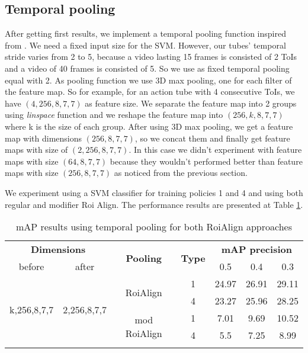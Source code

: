 \subsection{Temporal pooling}
After getting first results, we implement a temporal pooling function inspired from \cite{DBLP:journals/corr/HouCS17}. We need a
fixed input size for the SVM. However, our tubes' temporal stride varies from 2 to 5, because a video lasting 15 frames
is consisted of 2 ToIs and a video of 40 frames is consisted of 5. So we use as fixed temporal pooling equal
with 2. As pooling function we use 3D max pooling, one for each filter of the feature map.  So for example, for an action tube
with 4 consecutive ToIs, we  have $(4,256,8,7,7)$ as feature size. We separate the feature map into 2 groups using \textit{linspace}
function and we reshape the feature map into $(256,k,8,7,7)$ where k is the size of each group. After using 3D max pooling, we get
a feature map with dimensions $(256,8,7,7)$, so we concat them and finally get feature maps with size of $(2,256,8,7,7)$.
In this case we didn't experiment with feature maps with size $(64,8,7,7)$ because they wouldn't performed better than  feature maps with size $(256,8,7,7)$ as noticed from the previous section. \par
We experiment using a SVM classifier for training policies 1 and 4 and using both regular and modifier Roi Align. The
performance results are presented at Table \ref{table:svm_temp_pooling}.
\begin{center}
\begin{longtable}{||c | c| c| c||c c c||}

  \hline
 \multicolumn{2}{||c|}{\textbf{Dimensions}} & \multirow{2}{*}{\textbf{Pooling}} &\multirow{2}{*}{ \textbf{Type}} &\multicolumn{3}{|c||}{\textbf{mAP precision}}\\

  before & after & {} & {} & 0.5 &  0.4 & 0.3\\
  \hline   \hline

  \multirow{4}{*}{k,256,8,7,7} & \multirow{4}{*}{2,256,8,7,7} & \multirow{2}{*}{RoiAlign}  & 1 & 24.97 & 26.91 & 29.11 \\
  \cline{4-7}
  {} & {} & {} & 4 &  23.27 & 25.96 & 28.25 \\
  \cline{3-7}
  {} & {} & \multirow{2}{*}{mod RoiAlign} & 1 & 7.01 & 9.69 & 10.52 \\
  \cline{4-7}
  {} & {} & {} & 4 & 5.5 & 7.25 & 8.99 \\
  \hline

  \caption{mAP results using temporal pooling for both RoiAlign approaches}
  \label{table:svm_temp_pooling}
\end{longtable} 
\end{center}

